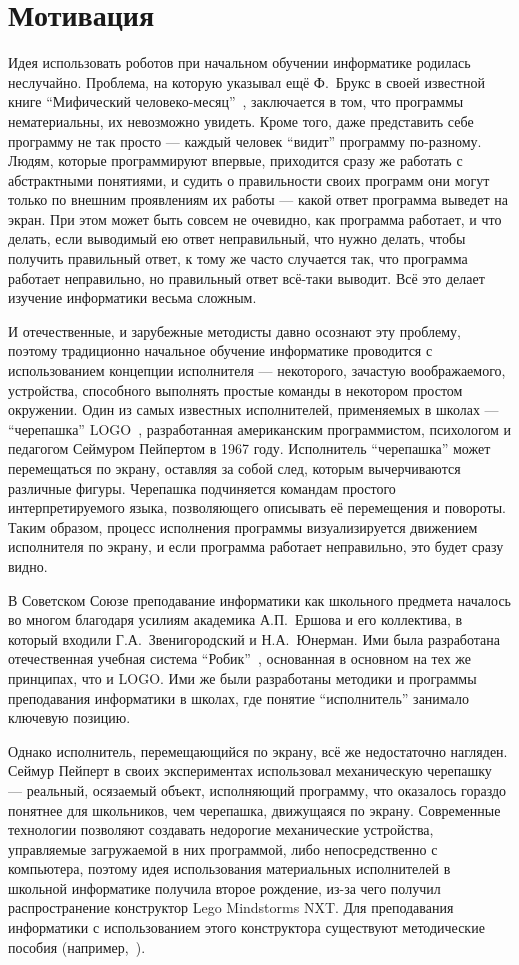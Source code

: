 \documentclass[a4paper]{article}
\begin{document}
\section{Мотивация}
Идея использовать роботов при начальном обучении информатике родилась неслучайно. Проблема, на которую указывал ещё Ф.~Брукс в своей известной книге ``Мифический человеко-месяц''~\cite{mythicalManMonth}, заключается в том, что программы нематериальны, их невозможно увидеть. Кроме того, даже представить себе программу не так просто --- каждый человек ``видит'' программу по-разному. Людям, которые программируют впервые, приходится сразу же работать с абстрактными понятиями, и судить о правильности своих программ они могут только по внешним проявлениям их работы --- какой ответ программа выведет на экран. При этом может быть совсем не очевидно, как программа работает, и что делать, если выводимый ею ответ неправильный, что нужно делать, чтобы получить правильный ответ, к тому же часто случается так, что программа работает неправильно, но правильный ответ всё-таки выводит. Всё это делает изучение информатики весьма сложным.

И отечественные, и зарубежные методисты давно осознают эту проблему, поэтому традиционно начальное обучение информатике проводится с использованием концепции исполнителя --- некоторого, зачастую воображаемого, устройства, способного выполнять простые команды в некотором простом окружении. Один из самых известных исполнителей, применяемых в школах --- ``черепашка'' LOGO~\cite{logo}, разработанная американским программистом, психологом и педагогом Сеймуром Пейпертом в 1967 году. Исполнитель ``черепашка'' может перемещаться по экрану, оставляя за собой след, которым вычерчиваются различные фигуры. Черепашка подчиняется командам простого интерпретируемого языка, позволяющего описывать её перемещения и повороты. Таким образом, процесс исполнения программы визуализируется движением исполнителя по экрану, и если программа работает неправильно, это будет сразу видно. 

В Советском Союзе преподавание информатики как школьного предмета началось во многом благодаря усилиям академика А.П.~Ершова и его коллектива, в который входили Г.А.~Звенигородский и Н.А.~Юнерман. Ими была разработана отечественная учебная система ``Робик''~\cite{robik}, основанная в основном на тех же принципах, что и LOGO. Ими же были разработаны методики и программы преподавания информатики в школах, где понятие ``исполнитель'' занимало ключевую позицию.

Однако исполнитель, перемещающийся по экрану, всё же недостаточно нагляден. Сеймур Пейперт в своих экспериментах использовал механическую черепашку~\cite{logoTurtle} --- реальный, осязаемый объект, исполняющий программу, что оказалось гораздо понятнее для школьников, чем черепашка, движущаяся по экрану. Современные технологии позволяют создавать недорогие механические устройства, управляемые загружаемой в них программой, либо непосредственно с компьютера, поэтому идея использования материальных исполнителей в школьной информатике получила второе рождение, из-за чего получил распространение конструктор Lego Mindstorms NXT. Для преподавания информатики с использованием этого конструктора существуют методические пособия (например,~\cite{filippov}). 
\end{document}

